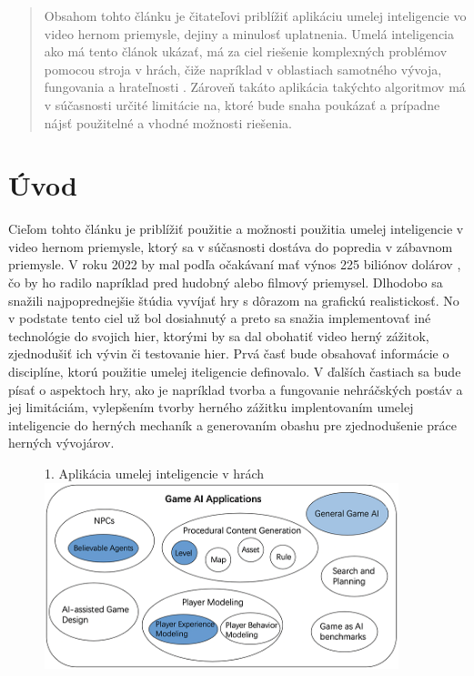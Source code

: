 \documentclass{article}
\author{Ondrej Podhorsky\\[2pt]
	{\small Slovenská technická univerzita v Bratislave}\\
	{\small Fakulta informatiky a informačných technológií}\\
	{\small \texttt{xpodhorsky@stuba.sk}}
	}
\date{\small 6. november 2022}
\begin{document}
\maketitle

\begin{abstract}

Obsahom tohto článku je čitateľovi priblížiť aplikáciu umelej inteligencie vo video hernom priemysle, dejiny a minulosť uplatnenia. Umelá inteligencia ako má tento článok ukázať, má za ciel riešenie komplexných problémov pomocou stroja v hrách, čiže napríklad v oblastiach samotného vývoja, fungovania a hrateľnosti . Zároveň takáto aplikácia takýchto algoritmov má v súčasnosti určité limitácie na, ktoré bude snaha poukázať a prípadne nájsť použitelné a vhodné možnosti riešenia.

\end{abstract}

\clearpage

\section{Úvod}

Cieľom tohto článku je priblížiť použitie a možnosti použitia umelej inteligencie v video hernom priemysle, ktorý sa v súčasnosti dostáva do popredia v zábavnom priemysle. V roku 2022 by mal podľa očakávaní mať výnos 225 biliónov dolárov \cite{TeodoraDobrilovat}, čo by ho radilo napríklad pred hudobný alebo filmový priemysel. Dlhodobo sa snažili najpoprednejšie štúdia vyvíjať hry s dôrazom  na grafickú realistickosť. No v podstate tento ciel už bol dosiahnutý a preto sa snažia implementovať iné technológie do svojich hier, ktorými by sa dal obohatiť video herný zážitok, zjednodušiť ich vývin či testovanie hier. Prvá časť bude obsahovať informácie o disciplíne, ktorú použitie umelej iteligencie definovalo. V ďalších častiach sa bude písať o aspektoch hry, ako je napríklad tvorba a fungovanie nehráčských postáv a jej limitáciám, vylepšením tvorby herného zážitku implentovaním umelej inteligencie do herných mechaník a generovaním obashu pre zjednodušenie práce herných vývojárov.

\begin{figure}{1. Aplikácia umelej inteligencie v hrách\cite{inproceedings}}
\centering
\includegraphics[width=103mm]{Game-AI-Applications.png}
\end{figure}
\end{document}
